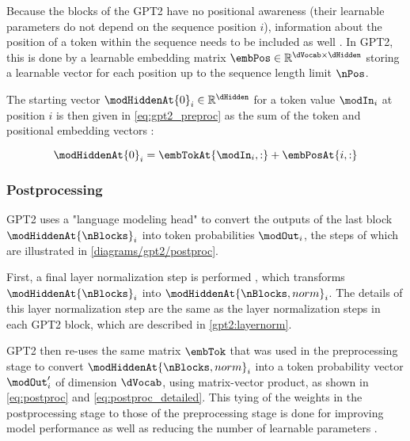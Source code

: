 Because the blocks of the GPT2 have no positional awareness (their learnable parameters do not depend on the sequence position $i$), information about the position of a token within the sequence needs to be included as well .
In GPT2, this is done by a learnable embedding matrix $\embPos \in \mathbb{R}^{\dVocab \times \dHidden}$ storing a learnable vector for each position up to the sequence length limit $\nPos$.

The starting vector $\modHiddenAt{0}_i \in \mathbb{R}^\dHidden$ for a token value $\modIn_i$ at position $i$ is then given in \cref{eq:gpt2_preproc} as the sum of the token and positional embedding vectors :

\begin{equation}
	\modHiddenAt{0}_i = \embTokAt{\modIn_i, :} + \embPosAt{i, :}
	\label{eq:gpt2_preproc}
\end{equation}



\subsubsection{Postprocessing}
\label{gpt2:postproc}

GPT2 uses a "language modeling head" \cite{HuggingFaceGPT2} to convert the outputs of the last block $\modHiddenAt{\nBlocks}_i$ into token probabilities $\modOut_i$, the steps of which are illustrated in \cref{diagrams/gpt2/postproc}.

First, a final layer normalization step is performed , which transforms $\modHiddenAt{\nBlocks}_i$ into $\modHiddenAt{\nBlocks, norm}_i$. The details of this layer normalization step are  the same as the layer normalization steps in each GPT2 block, which are described in \cref{gpt2:layernorm}.

GPT2 then re-uses the same matrix $\embTok$ that was used in the preprocessing stage to convert $\modHiddenAt{\nBlocks, norm}_i$ into a token probability vector $\modOut'_i$ of dimension $\dVocab$, using matrix-vector product, as shown in \cref{eq:postproc} and \cref{eq:postproc_detailed}.
This tying of the weights in the postprocessing stage to those of the preprocessing stage is done for improving model performance as well as reducing the number of learnable parameters \cite{weightstying}.

